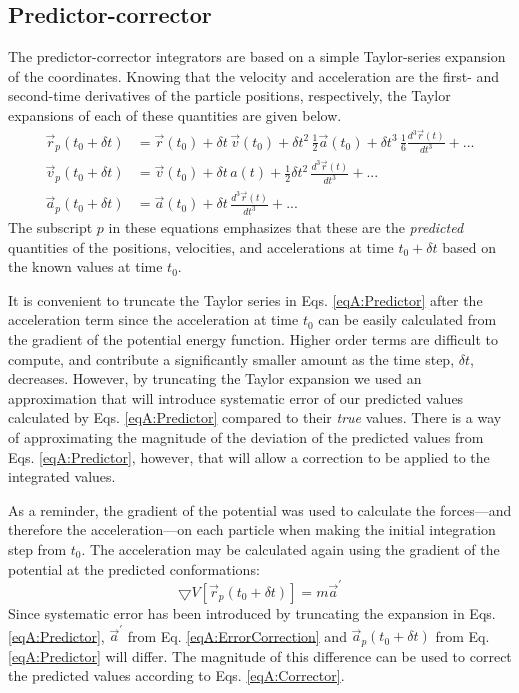 \subsection{Predictor-corrector}

The predictor-corrector integrators are based on a simple Taylor-series
expansion of the coordinates. Knowing that the velocity and acceleration are the
first- and second-time derivatives of the particle positions, respectively, the
Taylor expansions of each of these quantities are given below.
\begin{align}
   \vec{r}_p (t_0 + \delta t) & = \vec{r}(t_0) + \delta t \, \vec{v}(t_0) +
         \delta t^2 \, \frac 1 2 \vec{a}(t_0) + \delta t^3 \, \frac 1 6 \frac
         {d^3\vec{r}(t)} {dt^3} + ... \nonumber \\
   \vec{v}_p (t_0 + \delta t) & = \vec{v}(t_0) + \delta t \, a(t) + \frac 1 2 
         \delta t^2 \, \frac {d^3\vec{r}(t)} {dt^3} + ...
   \label{eqA:Predictor} \\
   \vec{a}_p (t_0 + \delta t) & = \vec{a}(t_0) + \delta t \, \frac
         {d^3\vec{r}(t)} {dt^3} + ... \nonumber
\end{align}
The subscript $p$ in these equations emphasizes that these are the
\emph{predicted} quantities of the positions, velocities, and accelerations at
time $t_0 + \delta t$ based on the known values at time $t_0$.

It is convenient to truncate the Taylor series in Eqs. \ref{eqA:Predictor} after
the acceleration term since the acceleration at time $t_0$ can be easily
calculated from the gradient of the potential energy function. Higher order
terms are difficult to compute, and contribute a significantly smaller amount as
the time step, $\delta t$, decreases. However, by truncating the Taylor
expansion we used an approximation that will introduce systematic error of our
predicted values calculated by Eqs. \ref{eqA:Predictor} compared to their
\emph{true} values. There is a way of approximating the magnitude of the
deviation of the predicted values from Eqs. \ref{eqA:Predictor}, however, that
will allow a correction to be applied to the integrated values.

As a reminder, the gradient of the potential was used to calculate the
forces---and therefore the acceleration---on each particle when making the
initial integration step from $t_0$. The acceleration may be calculated again
using the gradient of the potential at the predicted conformations:
\begin{equation}
   \bigtriangledown V\left[\vec{r}_p(t_0 + \delta t)\right] = m \vec{a}^{\prime}
   \label{eqA:ErrorCorrection}
\end{equation}
Since systematic error has been introduced by truncating the expansion in Eqs.
\ref{eqA:Predictor}, $\vec{a}^{\prime}$ from Eq. \ref{eqA:ErrorCorrection} and
$\vec{a}_p(t_0 + \delta t)$ from Eq. \ref{eqA:Predictor} will differ. The
magnitude of this difference can be used to correct the predicted values
according to Eqs. \ref{eqA:Corrector}.

